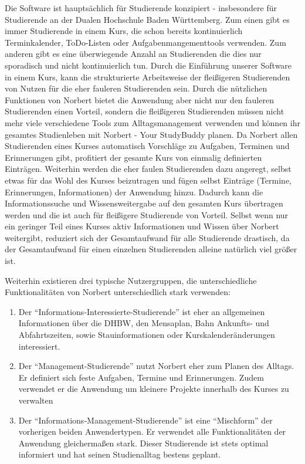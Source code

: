 Die Software ist hauptsächlich für Studierende konzipiert - insbesondere für Studierende an der Dualen Hochschule Baden Württemberg. Zum einen gibt es immer Studierende in einem Kurs, die schon bereits kontinuierlich Terminkalender, ToDo-Listen oder Aufgabenmangementtools verwenden. Zum anderen gibt es eine überwiegende Anzahl an Studierenden die dies nur sporadisch und nicht kontinuierlich tun. Durch die Einführung unserer Software in einem Kurs, kann die strukturierte Arbeitsweise der fleißigeren Studierenden von Nutzen für die eher fauleren Studierenden sein. Durch die nützlichen Funktionen von Norbert bietet die Anwendung aber nicht nur den fauleren Studierenden einen Vorteil, sondern die fleißigeren Studierenden müssen nicht mehr viele verschiedene Tools zum Alltagsmanagement verwenden und können ihr gesamtes Studienleben mit Norbert - Your StudyBuddy planen. Da Norbert allen Studierenden eines Kurses automatisch Vorschläge zu Aufgaben, Terminen und Erinnerungen gibt, profitiert der gesamte Kurs von einmalig definierten Einträgen. Weiterhin werden die eher faulen Studierenden dazu angeregt, selbst etwas für das Wohl des Kurses beizutragen und fügen selbst Einträge (Termine, Erinnerungen, Informationen) der Anwendung hinzu. Dadurch kann die Informationssuche und Wissensweitergabe auf den gesamten Kurs übertragen werden und die ist auch für fleißigere Studierende von Vorteil. Selbst wenn nur ein geringer Teil eines Kurses aktiv Informationen und Wissen über Norbert weitergibt, reduziert sich der Gesamtaufwand für alle Studierende drastisch, da der Gesamtaufwand für einen einzelnen Studierenden alleine natürlich viel größer ist.

Weiterhin existieren drei typische Nutzergruppen, die unterschiedliche Funktionalitäten von Norbert unterschiedlich stark verwenden:

\begin{enumerate}
	\item Der \enquote{Informations-Interessierte-Studierende} ist eher an allgemeinen Informationen über die DHBW, den Mensaplan, Bahn Ankunfts- und Abfahrtszeiten, sowie Stauinformationen oder Kurskalenderänderungen interessiert.
	
	\item Der \enquote{Management-Studierende} nutzt Norbert eher zum Planen des Alltags. Er definiert sich feste Aufgaben, Termine und Erinnerungen. Zudem verwendet er die Anwendung um kleinere Projekte innerhalb des Kurses zu verwalten
	
	\item Der \enquote{Informations-Management-Studierende} ist eine \enquote{Mischform} der vorherigen beiden Anwendertypen. Er verwendet alle Funktionalitäten der Anwendung gleichermaßen stark. Dieser Studierende ist stets optimal informiert und hat seinen Studienalltag bestens geplant. 
\end{enumerate}

